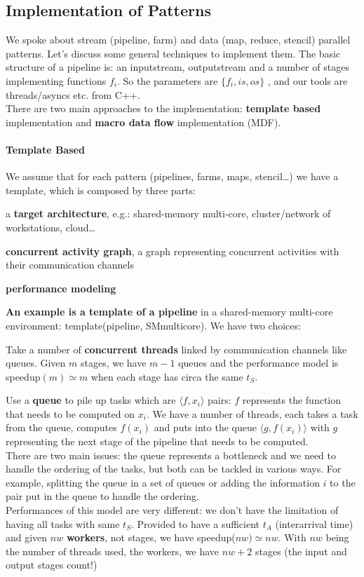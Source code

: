 \documentclass[10pt]{report}
\begin{document}
\subsection{Implementation of Patterns}
We spoke about stream (pipeline, farm) and data (map, reduce, stencil) parallel patterns. Let's discuss some general techniques to implement them. The basic structure of a pipeline is: an inputstream, outputstream and a number of stages implementing functions $f_i$. So the parameters are $\{f_i, is, os\}$ , and our tools are threads/asyncs etc. from C++.\\
There are two main approaches to the implementation: \textbf{template based} implementation and \textbf{macro data flow} implementation (MDF).
\paragraph{Template Based} We assume that for each pattern (pipelines, farms, maps, stencil\ldots) we have a template, which is composed by three parts:
\begin{list}{}{}
	\item a \textbf{target architecture}, e.g.: shared-memory multi-core, cluster/network of workstations, cloud\ldots
	\item \textbf{concurrent activity graph}, a graph representing concurrent activities with their communication channels
	\item \textbf{performance modeling}
\end{list}
\textbf{An example is a template of a pipeline} in a shared-memory multi-core environment: template(pipeline, SMmulticore). We have two choices:
\begin{list}{}{}
	\item Take a number of \textbf{concurrent threads} linked by communication channels like queues. Given $m$ stages, we have $m-1$ queues and the performance model is speedup$(m)\simeq m$ when each stage has circa the same $t_S$.
	
	\item Use a \textbf{queue} to pile up tasks which are $\langle f, x_i\rangle$ pairs: $f$ represents the function that needs to be computed on $x_i$. We have a number of threads, each takes a task from the queue, computes $f(x_i)$ and puts into the queue $\langle g, f(x_i)\rangle$ with $g$ representing the next stage of the pipeline that needs to be computed.\\
	There are two main issues: the queue represents a bottleneck and we need to handle the ordering of the tasks, but both can be tackled in various ways. For example, splitting the queue in a set of queues or adding the information $i$ to the pair put in the queue to handle the ordering.\\
	Performances of this model are very different: we don't have the limitation of having all tasks with same $t_S$. Provided to have a sufficient $t_A$ (interarrival time) and given $nw$ \textbf{workers}, not stages, we have speedup($nw) \simeq nw$. With $nw$ being the number of threads used, the workers, we have $nw+2$ stages (the input and output stages count!)
\end{list}
\end{document}
